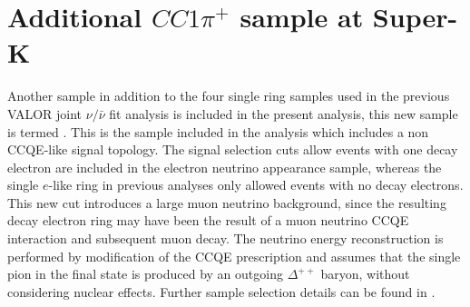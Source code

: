 
\section{Additional $CC1\pi^{+}$ sample at Super-K}
\label{sec:nuecconepi_sample}
Another sample in addition to the four single ring samples used in the previous VALOR joint $\nu/\bar{\nu}$ fit analysis \cite{OurRun1617b17cJointAnalysis3Flavour} is included in the present analysis, this new sample is termed \nueCConepi{}. This is the sample included in the analysis which includes a non CCQE-like signal topology. The signal selection cuts allow events with one decay electron are included in the electron neutrino appearance sample, whereas the single $e$-like ring in previous analyses only allowed events with no decay electrons. This new cut introduces a large muon neutrino background, since the resulting decay electron ring may have been the result of a muon neutrino CCQE interaction and subsequent muon decay. The neutrino energy reconstruction is performed by modification of the CCQE prescription and assumes that the single pion in the final state is produced by an outgoing $\Delta^{++}$ baryon, without considering nuclear effects. Further sample selection details can be found in \cite{InelSglPionNueDecayE}.
